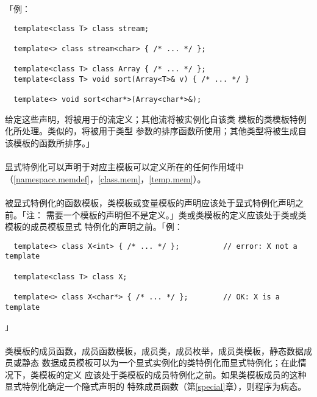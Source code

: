 
「例：
\begin{lstlisting}
  template<class T> class stream;

  template<> class stream<char> { /* ... */ };

  template<class T> class Array { /* ... */ };
  template<class T> void sort(Array<T>& v) { /* ... */ }

  template<> void sort<char*>(Array<char*>&);
\end{lstlisting}
给定这些声明，将被用于的流定义；其他流将被实例化自该类
模板的类模板特例化所处理。类似的，将被用于类型
参数的排序函数所使用；其他类型将被生成自该模板的函数所排序。」

\paragraph{}
显式特例化可以声明于对应主模板可以定义所在的任何作用域中
（\ref{namespace.memdef}，\ref{class.mem}，\ref{temp.mem}）。

\paragraph{}
被显式特例化的函数模板，类模板或变量模板的声明应该处于显式特例化声明之前。「注：
需要一个模板的声明但不是定义。」类或类模板的定义应该处于类或类模板的成员模板显式
特例化的声明之前。「例：
\begin{lstlisting}
  template<> class X<int> { /* ... */ };          // error: X not a template

  template<class T> class X;

  template<> class X<char*> { /* ... */ };        // OK: X is a template
\end{lstlisting}」

\paragraph{}
类模板的成员函数，成员函数模板，成员类，成员枚举，成员类模板，静态数据成员或静态
数据成员模板可以为一个显式实例化的类特例化而显式特例化；在此情况下，类模板的定义
应该处于类模板的成员特例化之前。如果类模板成员的这种显式特例化确定一个隐式声明的
特殊成员函数（第\ref{special}章），则程序为病态。


